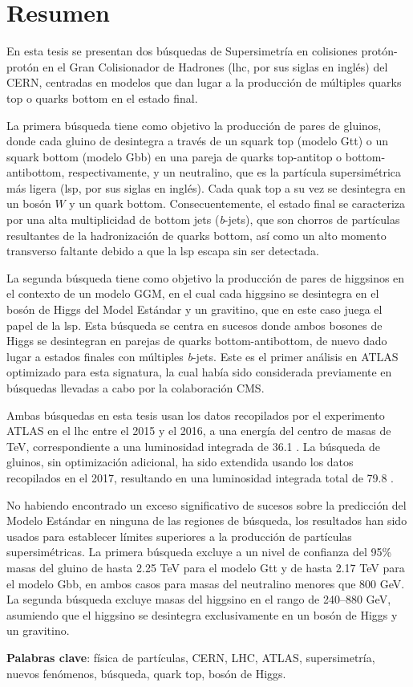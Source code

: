 \chapter*{Resumen}

En esta tesis se presentan dos b\'usquedas de Supersimetr\'ia en colisiones prot\'on-prot\'on en el Gran Colisionador de Hadrones (\gls{lhc}, por sus siglas en ingl\'es) del CERN,
centradas en modelos que dan lugar a la producci\'on de m\'ultiples quarks top o quarks bottom en el estado final.

La primera b\'usqueda tiene como objetivo la producci\'on de pares de gluinos, donde cada gluino de desintegra a trav\'es de un squark top (modelo Gtt) o un squark  
bottom (modelo Gbb) en una pareja de quarks top-antitop o bottom-antibottom, respectivamente, y un neutralino, que es la part\'icula supersim\'etrica m\'as ligera 
(\gls{lsp}, por sus siglas en ingl\'es). Cada quak top a su vez se desintegra en un bos\'on $W$ y un quark bottom.
Consecuentemente, el estado final se caracteriza por una alta multiplicidad de bottom jets (\textit{b}-jets), que son chorros de part\'iculas resultantes de
la hadronizaci\'on de quarks bottom, as\'i como un alto momento transverso faltante  debido a que la \gls{lsp} escapa sin ser detectada. 

La segunda b\'usqueda tiene como objetivo la producci\'on de pares de higgsinos en el contexto de un modelo GGM, en el cual cada higgsino 
se desintegra en el bos\'on de Higgs del Model Est\'andar y un gravitino, que en este caso juega el papel de la \gls{lsp}.
Esta b\'usqueda se centra en sucesos donde ambos bosones de Higgs se desintegran en parejas de quarks bottom-antibottom, de nuevo dado lugar a estados finales 
con m\'ultiples \textit{b}-jets. 
Este es el primer an\'alisis en ATLAS optimizado para esta signatura, la cual hab\'ia sido considerada previamente en b\'usquedas llevadas a cabo por
la colaboraci\'on CMS.

Ambas b\'usquedas en esta tesis usan los datos recopilados por el experimento ATLAS en el \gls{lhc} 
entre el 2015 y el 2016, a una energ\'ia del centro de masas de \cmtre TeV,
correspondiente a una luminosidad integrada de 36.1 \ifb.
La b\'usqueda de gluinos, sin optimizaci\'on adicional, ha sido extendida usando los datos recopilados en el 2017, resultando en una luminosidad integrada total de 79.8 \ifb.

No habiendo encontrado un exceso significativo de sucesos sobre la predicci\'on del Modelo Est\'andar en ninguna de las regiones de b\'usqueda,
los resultados han sido usados para establecer l\'imites superiores a la producci\'on de part\'iculas supersim\'etricas.
La primera b\'usqueda excluye a un nivel de confianza del 95\% masas del gluino de hasta 2.25 TeV para el modelo Gtt
y de hasta 2.17 TeV para el modelo Gbb, en ambos casos para masas del neutralino menores que 800 GeV.
La segunda b\'usqueda excluye masas del higgsino en el rango de 240--880 GeV, asumiendo que 
el higgsino se desintegra exclusivamente en un bos\'on de Higgs y un gravitino.

\par\bigskip
\par\bigskip 
\par\bigskip

\noindent \textbf{Palabras clave}: f\'isica de part\'iculas, CERN, LHC, ATLAS, supersimetr\'ia, nuevos fen\'omenos, b\'usqueda, quark top, bos\'on de Higgs.

